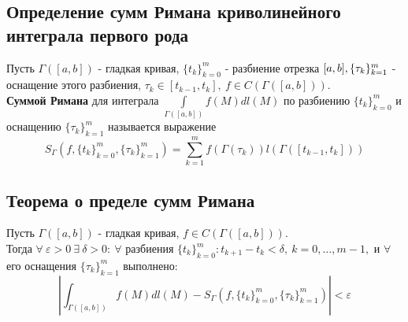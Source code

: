 \documentclass[main]{subfiles}
\begin{document}
\subsection{Определение сумм Римана криволинейного интеграла первого рода}
Пусть $\Gamma([a,b])$ - гладкая кривая, $\{ t_k\}^m_{k=0}$ - разбиение отрезка $[a,b],\\ \{\tau_k\}^m_{k=1}$ -
 оснащение этого разбиения, $\tau_k\in[t_{k-1},t_k],\ f\in C(\Gamma([a,b])).$ \\\textbf{Суммой Римана} для интеграла $\int\limits_{\Gamma([a,b])} f(M)dl(M)$ по разбиению $\{ t_k\}_{k=0}^m$ 
   и оснащению $\{\tau_k\}_{k=1}^m$ называется выражение 
\[ S_\Gamma (f,\{t_k\}^m_{k=0},\{\tau_k\}^m_{k=1})=\sum\limits_{k=1}^m f(\Gamma(\tau_k))l(\Gamma([t_{k-1},t_k]))\tag{27} \]
\subsection{Теорема о пределе сумм Римана}
Пусть $\Gamma([a,b])$ - гладкая кривая, $f\in C(\Gamma([a,b]))$.\\
Тогда $\forall\ \varepsilon>0\ \exists\ \delta>0:\ \forall $ разбиения $\{t_k\}^m_{k=0}: t_{k+1}-t_k<\delta,\ k=0,\dots,m-1,$ и $\forall$ его оснащения $\{\tau_k\}^m_{k=1}$ выполнено:
\[ |\int_{\Gamma([a,b])} f(M)dl(M)-S_\Gamma(f,\{t_k\}^m_{k=0},\{\tau_k\}^m_{k=1})|<\varepsilon\tag{28} \]
\end{document}
